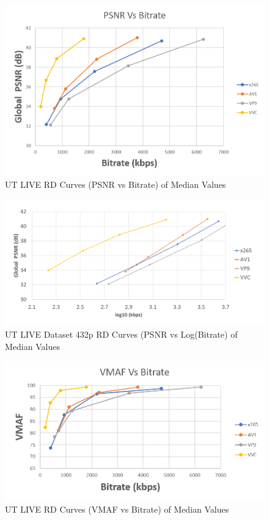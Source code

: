 \documentclass{book}
\begin{document}
\begin{figure}[hbt!]
	\centering
	\includegraphics[width=1.0\linewidth]{pictures/ch7/UT_LIVE-432p_BD-PSNR1.png}
	\caption{UT LIVE RD Curves (PSNR vs Bitrate) of Median Values}
	\label{fig:UTLIVE-PSNR}
\end{figure}


\begin{figure}[hbt!]
	\centering
	\includegraphics[width=\linewidth]{pictures/ch7/UT_LIVE-432p_logPSNR.png}
	\caption{UT LIVE Dataset 432p RD Curves (PSNR vs Log(Bitrate) of Median Values}
	\label{fig:UTLIVE-432p-logPSNR}
\end{figure}


\begin{figure}[hbt!]
	\centering
	\includegraphics[width=1.0\linewidth]{pictures/ch7/UT_LIVE-432p_BD-VMAF.png}
	\caption{UT LIVE RD Curves (VMAF vs Bitrate) of Median Values}
	\label{fig:UTLIVE-VMAF}
\end{figure}
\end{document}
